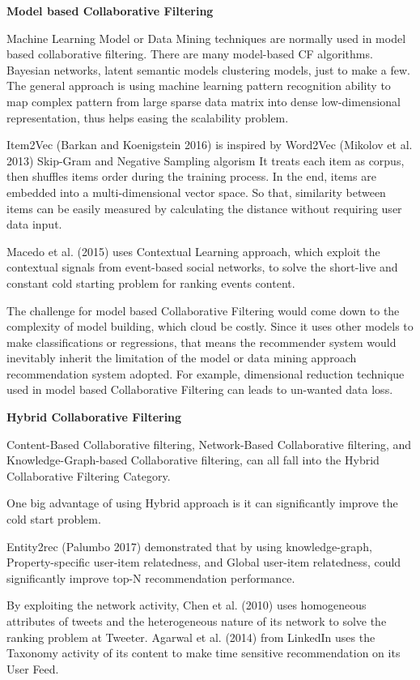 \bigskip
\textbf{Model based Collaborative Filtering}

Machine Learning Model or Data Mining techniques are normally used in model based collaborative filtering. There are many model-based CF algorithms. Bayesian networks, latent semantic models clustering models, just to make a few. The general approach is using machine learning pattern recognition ability to map complex pattern from large sparse data matrix into dense low-dimensional representation, thus helps easing the scalability problem.  

Item2Vec (Barkan and Koenigstein 2016) is inspired by Word2Vec (Mikolov et al. 2013) Skip-Gram and Negative Sampling algorism It treats each item as corpus, then shuffles items order during the training process. In the end, items are embedded into a multi-dimensional vector space. So that, similarity between items can be easily measured by calculating the distance without requiring user data input.  

Macedo et al. (2015) uses Contextual Learning approach, which exploit the contextual signals from event-based social networks, to solve the short-live and constant cold starting problem for ranking events content. 

The challenge for model based Collaborative Filtering would come down to the complexity of model building, which cloud be costly.  Since it uses other models to make classifications or regressions, that means the recommender system would inevitably inherit the limitation of the model or data mining approach recommendation system adopted. For example, dimensional reduction technique used in model based Collaborative Filtering can leads to un-wanted data loss. 
 

\bigskip
\textbf{Hybrid Collaborative Filtering}

Content-Based Collaborative filtering, Network-Based Collaborative filtering, and Knowledge-Graph-based Collaborative filtering, can all fall into the Hybrid Collaborative Filtering Category.  

One big advantage of using Hybrid approach is it can significantly improve the cold start problem.  

Entity2rec (Palumbo 2017) demonstrated that by using knowledge-graph, Property-specific user-item relatedness, and Global user-item relatedness, could significantly improve top-N recommendation performance. 

By exploiting the network activity, Chen et al. (2010) uses homogeneous attributes of tweets and the heterogeneous nature of its network to solve the ranking problem at Tweeter. Agarwal et al. (2014) from LinkedIn uses the Taxonomy activity of its content to make time sensitive recommendation on its User Feed. 

